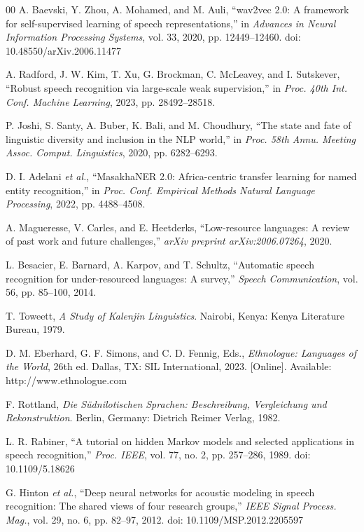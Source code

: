 \documentclass[conference]{IEEEtran}
\begin{document}
\begin{thebibliography}{00}
 A. Baevski, Y. Zhou, A. Mohamed, and M. Auli, ``wav2vec 2.0: A framework for self-supervised learning of speech representations,'' in \textit{Advances in Neural Information Processing Systems}, vol. 33, 2020, pp. 12449--12460. doi: 10.48550/arXiv.2006.11477

 A. Radford, J. W. Kim, T. Xu, G. Brockman, C. McLeavey, and I. Sutskever, ``Robust speech recognition via large-scale weak supervision,'' in \textit{Proc. 40th Int. Conf. Machine Learning}, 2023, pp. 28492--28518.

 P. Joshi, S. Santy, A. Buber, K. Bali, and M. Choudhury, ``The state and fate of linguistic diversity and inclusion in the NLP world,'' in \textit{Proc. 58th Annu. Meeting Assoc. Comput. Linguistics}, 2020, pp. 6282--6293.

 D. I. Adelani \textit{et al.}, ``MasakhaNER 2.0: Africa-centric transfer learning for named entity recognition,'' in \textit{Proc. Conf. Empirical Methods Natural Language Processing}, 2022, pp. 4488--4508.

 A. Magueresse, V. Carles, and E. Heetderks, ``Low-resource languages: A review of past work and future challenges,'' \textit{arXiv preprint arXiv:2006.07264}, 2020.

 L. Besacier, E. Barnard, A. Karpov, and T. Schultz, ``Automatic speech recognition for under-resourced languages: A survey,'' \textit{Speech Communication}, vol. 56, pp. 85--100, 2014.

 T. Toweett, \textit{A Study of Kalenjin Linguistics}. Nairobi, Kenya: Kenya Literature Bureau, 1979.

 D. M. Eberhard, G. F. Simons, and C. D. Fennig, Eds., \textit{Ethnologue: Languages of the World}, 26th ed. Dallas, TX: SIL International, 2023. [Online]. Available: http://www.ethnologue.com

 F. Rottland, \textit{Die S\"udnilotischen Sprachen: Beschreibung, Vergleichung und Rekonstruktion}. Berlin, Germany: Dietrich Reimer Verlag, 1982.

 L. R. Rabiner, ``A tutorial on hidden Markov models and selected applications in speech recognition,'' \textit{Proc. IEEE}, vol. 77, no. 2, pp. 257--286, 1989. doi: 10.1109/5.18626

 G. Hinton \textit{et al.}, ``Deep neural networks for acoustic modeling in speech recognition: The shared views of four research groups,'' \textit{IEEE Signal Process. Mag.}, vol. 29, no. 6, pp. 82--97, 2012. doi: 10.1109/MSP.2012.2205597


\end{thebibliography}
\end{document}
